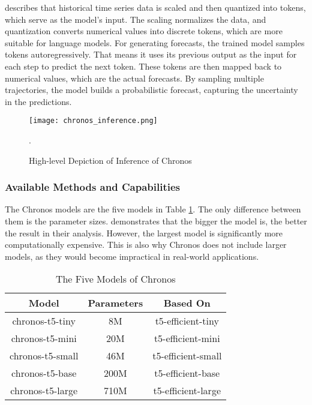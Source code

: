 \documentclass[12pt,a4paper]{article}
\begin{document}
\cite{ansari2024chronos} describes that historical time series data is scaled and then quantized into tokens, which serve as the model's input. The scaling normalizes the data, and quantization converts numerical values into discrete tokens, which are more suitable for language models. For generating forecasts, the trained model samples tokens autoregressively. That means it uses its previous output as the input for each step to predict the next token. These tokens are then mapped back to numerical values, which are the actual forecasts. By sampling multiple trajectories, the model builds a probabilistic forecast, capturing the uncertainty in the predictions.

\begin{figure}[htbp]
  \centering
  \texttt{[image: chronos\_inference.png]}
  \caption{High-level Depiction of Inference of Chronos \parencite{ansari2024chronos}}.
  \label{chronosinference}
\end{figure}

\subsubsection{Available Methods and Capabilities}

The Chronos models are the five models in Table \ref{chronosmodels}. The only difference between them is the parameter sizes. \cite{ansari2024chronos} demonstrates that the bigger the model is, the better the result in their analysis. However, the largest model is significantly more computationally expensive. This is also why Chronos does not include larger models, as they would become impractical in real-world applications. 

\begin{table}[ht]
  \centering
  \caption{The Five Models of Chronos \parencite{ansari2024chronos}}
  \label{chronosmodels}
  \begin{tabular}{ccc} %
  \toprule
  \textbf{Model} & \textbf{Parameters} & \textbf{Based On} \\ 
  \midrule
  chronos-t5-tiny & 8M & t5-efficient-tiny \\ 
  chronos-t5-mini & 20M & t5-efficient-mini \\ 
  chronos-t5-small & 46M & t5-efficient-small \\ 
  chronos-t5-base & 200M & t5-efficient-base \\ 
  chronos-t5-large & 710M & t5-efficient-large \\ 
  \bottomrule
  \end{tabular}
\end{table}
\end{document}
